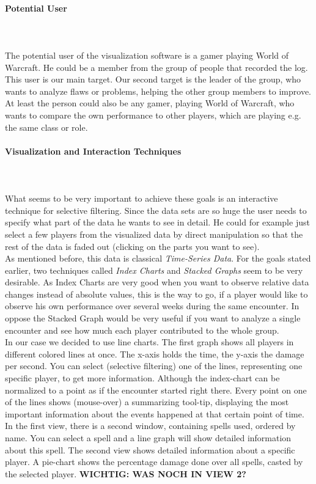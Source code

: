 \documentclass{scrartcl}
\begin{document}
\paragraph{Potential User}
\hfill \\ \hfill \\
The potential user of the visualization software is a gamer playing World of Warcraft. He could be a member from the group of people that recorded the log. This user is our main target. Our second target is the leader of the group, who wants to analyze flaws or problems, helping the other group members to improve. At least the person could also be any gamer, playing World of Warcraft, who wants to compare the own performance to other players, which are playing e.g. the same class or role. 

\paragraph{Visualization and Interaction Techniques}
\hfill \\ \hfill \\
What seems to be very important to achieve these goals is an interactive technique for selective filtering. Since the data sets are so huge the user needs to specify what part of the data he wants to see in detail. He could for example just select a few players from the visualized data by direct manipulation so that the rest of the data is faded out (clicking on the parts you want to see).\\
As mentioned before, this data is classical \emph{Time-Series Data}. For the goals stated earlier, two techniques called \emph{Index Charts} and \emph{Stacked Graphs} seem to be very desirable. As Index Charts are very good when you want to observe relative data changes instead of absolute values, this is the way to go, if a player would like to observe his own performance over several weeks during the same encounter. In oppose the Stacked Graph would be very useful if you want to analyze a single encounter and see how much each player contributed to the whole group.\\
In our case we decided to use line charts. The first graph shows all players in different colored lines at once. The x-axis holds the time, the y-axis the damage per second. You can select (selective filtering) one of the lines, representing one specific player, to get more information. Although the index-chart can be normalized to a point as if the encounter started right there. Every point on one of the lines shows (mouse-over) a summarizing tool-tip, displaying the most important information about the events happened at that certain point of time.\\
In the first view, there is a second window, containing spells used, ordered by name. You can select a spell and a line graph will show detailed information about this spell.
The second view shows detailed information about a specific player. A pie-chart shows the percentage damage done over all spells, casted by the selected player. \textbf{WICHTIG: WAS NOCH IN VIEW 2?}
\end{document}
